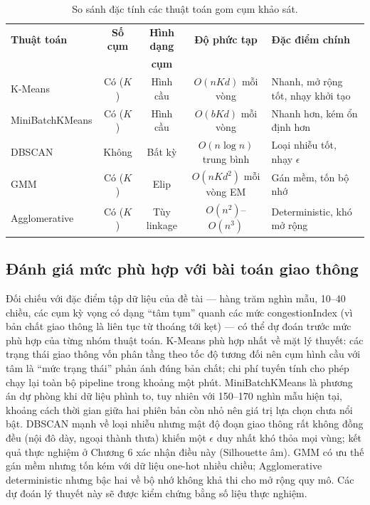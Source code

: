 \begin{table}[h!]
\centering
\caption{So sánh đặc tính các thuật toán gom cụm khảo sát.}
\label{tab:cmp_alg}
\small
\begin{tabularx}{\textwidth}{lcccX}
\toprule
\textbf{Thuật toán} & \textbf{Số cụm} & \textbf{Hình dạng} & \textbf{Độ phức tạp} & \textbf{Đặc điểm chính}\\
 & & \textbf{cụm} & & \\
\midrule
K-Means & Có ($K$) & Hình cầu & $O(nKd)$ mỗi vòng & Nhanh, mở rộng tốt, nhạy khởi tạo\\
MiniBatchKMeans & Có ($K$) & Hình cầu & $O(bKd)$ mỗi vòng & Nhanh hơn, kém ổn định hơn\\
DBSCAN & Không & Bất kỳ & $O(n \log n)$ trung bình & Loại nhiễu tốt, nhạy $\epsilon$\\
GMM & Có ($K$) & Elip & $O(nKd^2)$ mỗi vòng EM & Gán mềm, tốn bộ nhớ\\
Agglomerative & Có ($K$) & Tùy linkage & $O(n^2)$--$O(n^3)$ & Deterministic, khó mở rộng\\
\bottomrule
\end{tabularx}
\end{table}

\subsection{Đánh giá mức phù hợp với bài toán giao thông}
Đối chiếu với đặc điểm tập dữ liệu của đề tài --- hàng trăm nghìn mẫu, 10--40 chiều, các cụm kỳ vọng có dạng ``tâm tụm'' quanh các mức congestionIndex (vì bản chất giao thông là liên tục từ thoáng tới kẹt) --- có thể dự đoán trước mức phù hợp của từng nhóm thuật toán. K-Means phù hợp nhất về mặt lý thuyết: các trạng thái giao thông vốn phân tầng theo tốc độ tương đối nên cụm hình cầu với tâm là ``mức trạng thái'' phản ánh đúng bản chất; chi phí tuyến tính cho phép chạy lại toàn bộ pipeline trong khoảng một phút. MiniBatchKMeans là phương án dự phòng khi dữ liệu phình to, tuy nhiên với 150--170 nghìn mẫu hiện tại, khoảng cách thời gian giữa hai phiên bản còn nhỏ nên giá trị lựa chọn chưa nổi bật. DBSCAN mạnh về loại nhiễu nhưng mật độ đoạn giao thông rất không đồng đều (nội đô dày, ngoại thành thưa) khiến một $\epsilon$ duy nhất khó thỏa mọi vùng; kết quả thực nghiệm ở Chương 6 xác nhận điều này (Silhouette âm). GMM có ưu thế gán mềm nhưng tốn kém với dữ liệu one-hot nhiều chiều; Agglomerative deterministic nhưng bậc hai về bộ nhớ không khả thi cho mở rộng quy mô. Các dự đoán lý thuyết này sẽ được kiểm chứng bằng số liệu thực nghiệm.

